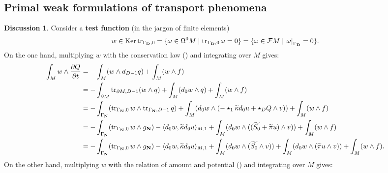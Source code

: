 \documentclass{elsarticle}
\theoremstyle{definition}
\newtheorem{discussion}[theorem]{Discussion}
\newcommand{\inner}[2]{\langle#1,#2\rangle}
\newcommand{\tr}{\mathop{\rm tr}\nolimits}
\newcommand{\Ker}{\mathop{\rm Ker}\nolimits}
\newcommand{\set}[2]{\{#1 \mid #2\}}
\newcommand{\restrict}[2]{\left.#1\right|_{#2}}
\newcommand{\newterm}[1]{\textbf{#1}}
\newcommand{\Dirichlet}{\mathbf{D}}
\newcommand{\Neumann}{\mathbf{N}}
\begin{document}
\subsection{Primal weak formulations of transport phenomena}
\label{sec:continuum/primal}

\begin{discussion}
  Consider a \newterm{test function} (in the jargon of finite elements)
  \begin{equation}
    w \in \Ker \tr_{\Gamma_{\Dirichlet}, 0}
    = \set{\omega \in \Omega^0 M}{\tr_{\Gamma_{\Dirichlet}, 0} \omega = 0}
    = \set{\omega \in \mathcal{F} M}{\restrict{\omega}{\Gamma_\Dirichlet} = 0}.
  \end{equation}
  On the one hand, multiplying $w$ with the conservation law () and integrating over $M$ gives:
  \begin{equation}
    \label{eq:continuum/primal_weak/conservation_law}
    \begin{split}
      \int_M w \wedge \frac{\partial Q}{\partial t}
      & = - \int_M (w \wedge d_{D - 1} q) + \int_M (w \wedge f) \\
      & = - \int_{\partial M} \tr_{\partial M, D - 1} (w \wedge q)
        + \int_M (d_0 w \wedge q)
        + \int_M (w \wedge f) \\
      & =
        - \int_{\Gamma_{\Neumann}}
          (\tr_{\Gamma_{\Neumann}, 0} w \wedge \tr_{\Gamma_{\Neumann}, D - 1} q)
        + \int_M (d_0 w \wedge (- \star_1 \widetilde{\kappa} d_0 u + \star_D Q \wedge v))
        + \int_M (w \wedge f) \\
      & = - \int_{\Gamma_{\Neumann}} (\tr_{\Gamma_{\Neumann}, 0} w \wedge g_{\Neumann})
        - \inner{d_0 w}{\widetilde{\kappa} d_0 u}_{M, 1}
        + \int_M (d_0 w \wedge ((\widetilde{S_0} + \widetilde{\pi} u) \wedge v))
        + \int_M (w \wedge f) \\
      & = - \int_{\Gamma_{\Neumann}} (\tr_{\Gamma_{\Neumann}, 0} w \wedge g_{\Neumann})
        - \inner{d_0 w}{\widetilde{\kappa} d_0 u}_{M, 1}
        + \int_M (d_0 w \wedge (\widetilde{S_0} \wedge v))
        + \int_M (d_0 w \wedge (\widetilde{\pi} u \wedge v))
        + \int_M (w \wedge f).
    \end{split}
  \end{equation}
  On the other hand, multiplying $w$
  with the relation of amount and potential () and integrating over $M$ gives:
  \begin{equation}

\end{equation}
\end{discussion}
\end{document}
